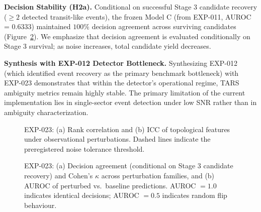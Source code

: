 \textbf{Decision Stability (H2a).} Conditional on successful Stage 3 candidate recovery
($\ge 2$ detected transit-like events), the frozen Model C (from EXP-011, AUROC = 0.6333)
maintained $100\%$ decision agreement across surviving candidates (Figure~\ref{fig:exp023_agree}). We emphasize that decision agreement
is evaluated conditionally on Stage 3 survival; as noise increases, total candidate yield decreases.

\textbf{Synthesis with EXP-012 Detector Bottleneck.} Synthesizing EXP-012 (which identified
event recovery as the primary benchmark bottleneck) with EXP-023 demonstrates that within the
detector's operational regime, TARS ambiguity metrics remain highly stable. The primary limitation
of the current implementation lies in single-sector event detection under low SNR rather than in
ambiguity characterization.

\begin{figure}[htbp]
\centering
{}
\caption{EXP-023: (a) Rank correlation and (b) ICC of topological features under
observational perturbations. Dashed lines indicate the preregistered noise tolerance
threshold.}
\label{fig:exp023_rho}
\end{figure}

\begin{figure}[htbp]
\centering
{}
\caption{EXP-023: (a) Decision agreement (conditional on Stage 3 candidate recovery) and Cohen's $\kappa$ across perturbation
families, and (b) AUROC of perturbed vs.~baseline predictions. AUROC $= 1.0$ indicates
identical decisions; AUROC $= 0.5$ indicates random flip behaviour.}
\label{fig:exp023_agree}
\end{figure}
